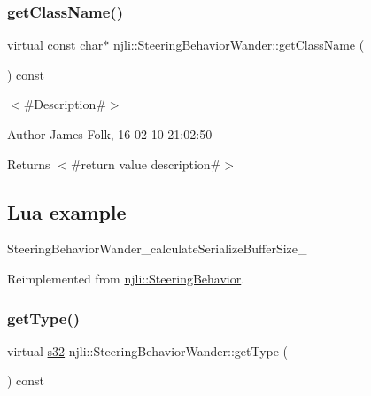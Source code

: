 \subsubsection{\texorpdfstring{get\+Class\+Name()}{getClassName()}}
{\footnotesize\ttfamily virtual const char$\ast$ njli\+::\+Steering\+Behavior\+Wander\+::get\+Class\+Name (\begin{DoxyParamCaption}{ }\end{DoxyParamCaption}) const\hspace{0.3cm}{\ttfamily [virtual]}}



$<$\#\+Description\#$>$ 

\begin{DoxyAuthor}{Author}
James Folk, 16-\/02-\/10 21\+:02\+:50
\end{DoxyAuthor}
\begin{DoxyReturn}{Returns}
$<$\#return value description\#$>$
\end{DoxyReturn}
\hypertarget{classnjli_1_1_steering_behavior_wander_ex1}{}\subsection{Lua example}\label{classnjli_1_1_steering_behavior_wander_ex1}

\begin{DoxyCodeInclude}
\end{DoxyCodeInclude}
Steering\+Behavior\+Wander\+\_\+calculate\+Serialize\+Buffer\+Size\+\_\+ 

Reimplemented from \mbox{\hyperlink{classnjli_1_1_steering_behavior_abb58d6982dc295fc3e90f096f51b0ef8}{njli\+::\+Steering\+Behavior}}.

\mbox{\label{classnjli_1_1_steering_behavior_wander_afc8c0a5a0d045370ce1a86d192b2b06d}} 
\subsubsection{\texorpdfstring{get\+Type()}{getType()}}
{\footnotesize\ttfamily virtual \mbox{\hyperlink{_util_8h_aa62c75d314a0d1f37f79c4b73b2292e2}{s32}} njli\+::\+Steering\+Behavior\+Wander\+::get\+Type (\begin{DoxyParamCaption}{ }\end{DoxyParamCaption}) const\hspace{0.3cm}{\ttfamily [virtual]}}



